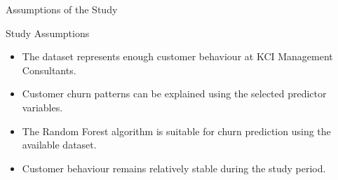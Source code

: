 \documentclass[10pt]{beamer}
\begin{document}
\begin{frame}{Assumptions of the Study}
	
	\small
	
	\begin{exampleblock}{Study Assumptions}
		\begin{itemize}
			\item The dataset represents enough customer behaviour at KCI Management Consultants.
			
			\item Customer churn patterns can be explained using the selected predictor variables.
			
			\item The Random Forest algorithm is suitable for churn prediction using the available dataset.
			
			\item Customer behaviour remains relatively stable during the study period.
		\end{itemize}
	\end{exampleblock}
	
\end{frame}	
	
	
	
\end{document}
